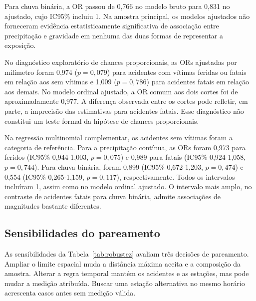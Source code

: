 \documentclass[12pt]{article}
\begin{document}
Para chuva binária, a OR passou de 0,766 no modelo bruto para 0,831
no ajustado, cujo IC95\% incluiu 1. Na amostra principal, os modelos
ajustados não forneceram evidência estatisticamente significativa de
associação entre precipitação e gravidade em nenhuma das duas formas
de representar a exposição.

No diagnóstico exploratório de chances proporcionais, as ORs ajustadas
por milímetro foram 0,974 ($p=0{,}079$) para acidentes com vítimas
feridas ou fatais em relação aos sem vítimas e 1,009 ($p=0{,}786$)
para acidentes fatais em relação aos demais. No modelo ordinal
ajustado, a OR comum aos dois cortes foi de aproximadamente 0,977.
A diferença observada entre os cortes pode refletir, em parte, a
imprecisão das estimativas para acidentes fatais. Esse diagnóstico não
constitui um teste formal da hipótese de chances proporcionais.

Na regressão multinomial complementar, os acidentes sem vítimas
foram a categoria de referência. Para a precipitação contínua, as
ORs foram 0,973 para feridos (IC95\% 0,944-1,003, $p=0{,}075$) e
0,989 para fatais (IC95\% 0,924-1,058, $p=0{,}744$). Para chuva
binária, foram 0,899 (IC95\% 0,672-1,203, $p=0{,}474$) e 0,554
(IC95\% 0,265-1,159, $p=0{,}117$), respectivamente. Todos os
intervalos incluíram 1, assim como no modelo ordinal ajustado.
O intervalo mais amplo, no contraste de acidentes fatais para chuva
binária, admite associações de magnitudes bastante diferentes.

\subsection{Sensibilidades do pareamento}

As sensibilidades da Tabela~\ref{tab:robustez} avaliam três decisões
de pareamento. Ampliar o limite espacial muda a distância máxima aceita
e a composição da amostra. Alterar a regra temporal mantém os acidentes
e as estações, mas pode mudar a medição atribuída. Buscar uma estação
alternativa no mesmo horário acrescenta casos antes sem medição válida.
\end{document}
